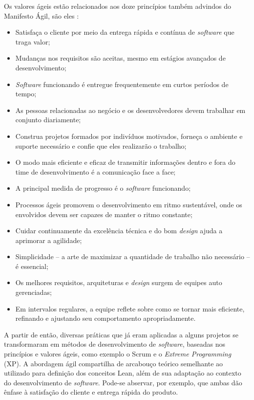 Os valores ágeis estão relacionados aos doze princípios também advindos do Manifesto Ágil, são eles \cite{manifesto}:
\begin{itemize}
\item Satisfaça o cliente por meio da entrega rápida e contínua de  \textit{software} que traga valor;
\item Mudanças nos requisitos são aceitas, mesmo em estágios avançados de desenvolvimento;
\item  \textit{Software} funcionando é entregue frequentemente em curtos períodos de tempo;
\item As pessoas relacionadas ao negócio e os desenvolvedores devem trabalhar em conjunto diariamente;
\item Construa projetos formados por indivíduos motivados, forneça o ambiente e suporte necessário e confie que eles realizarão o trabalho;
\item O modo mais eficiente e eficaz de transmitir informações dentro e fora do time de desenvolvimento é a comunicação face a face;
\item A principal medida de progresso é o  \textit{software} funcionando;
\item Processos ágeis promovem o desenvolvimento em ritmo sustentável, onde os envolvidos devem ser capazes de manter o ritmo constante;
\item Cuidar continuamente da excelência técnica e do bom \textit{design} ajuda a aprimorar a agilidade;
\item Simplicidade – a arte de maximizar a quantidade de trabalho não necessário – é essencial;
\item Os melhores requisitos, arquiteturas e \textit{design} surgem de equipes auto gerenciadas;
\item Em intervalos regulares, a equipe reflete sobre como se tornar mais eficiente, refinando e ajustando seu comportamento apropriadamente.
\end{itemize}

A partir de então, diversas práticas que já eram aplicadas a alguns projetos se transformaram em métodos de desenvolvimento de  \textit{software}, baseadas nos princípios e valores ágeis, como exemplo o Scrum e o \textit{Extreme Programming} (XP). A abordagem ágil compartilha de arcabouço teórico semelhante ao utilizado para definição dos conceitos Lean, além de sua adaptação ao contexto do desenvolvimento de  \textit{software}. Pode-se abservar, por exemplo, que ambas dão ênfase à satisfação do cliente e entrega rápida do produto.

